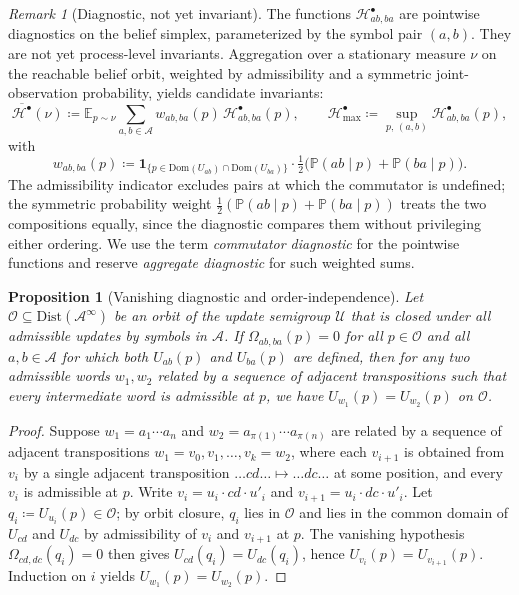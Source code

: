 \documentclass[11pt,a4paper]{article}
\theoremstyle{plain}
\newtheorem{proposition}[theorem]{Proposition}
\theoremstyle{definition}
\theoremstyle{remark}
\newtheorem{remark}[theorem]{Remark}
\newcommand{\Dist}{\mathrm{Dist}}
\newcommand{\Prob}{\mathbb{P}}
\newcommand{\eqdef}{\coloneqq}
\newcommand{\Alphabet}{\mathcal{A}}
\newcommand{\Dom}{\mathrm{Dom}}
\begin{document}
\begin{remark}[Diagnostic, not yet invariant]
\label{rem:diagnostic}
The functions $\mathcal{H}^{\bullet}_{ab,ba}$ are pointwise diagnostics on the belief simplex, parameterized by the symbol pair $(a, b)$. They are not yet process-level invariants. Aggregation over a stationary measure $\nu$ on the reachable belief orbit, weighted by admissibility and a symmetric joint-observation probability, yields candidate invariants:
\begin{equation}
    \overline{\mathcal{H}^{\bullet}}(\nu) \eqdef \mathbb{E}_{p \sim \nu} \sum_{a, b \in \Alphabet} w_{ab,ba}(p)\, \mathcal{H}^{\bullet}_{ab,ba}(p), \qquad \mathcal{H}^{\bullet}_{\max} \eqdef \sup_{p, \,(a,b)} \mathcal{H}^{\bullet}_{ab,ba}(p),
\end{equation}
with
\begin{equation}
    w_{ab,ba}(p) \eqdef \mathbf{1}_{\{p \in \Dom(U_{ab}) \cap \Dom(U_{ba})\}} \cdot \tfrac{1}{2}\bigl(\Prob(ab \mid p) + \Prob(ba \mid p)\bigr).
\end{equation}
The admissibility indicator excludes pairs at which the commutator is undefined; the symmetric probability weight $\tfrac{1}{2}(\Prob(ab \mid p) + \Prob(ba \mid p))$ treats the two compositions equally, since the diagnostic compares them without privileging either ordering. We use the term \emph{commutator diagnostic} for the pointwise functions and reserve \emph{aggregate diagnostic} for such weighted sums.
\end{remark}

\begin{proposition}[Vanishing diagnostic and order-independence]
\label{prop:commutative-action}
Let $\mathcal{O} \subseteq \Dist(\Alphabet^\infty)$ be an orbit of the update semigroup $\mathcal{U}$ that is closed under all admissible updates by symbols in $\Alphabet$. If $\Omega_{ab,ba}(p) = 0$ for all $p \in \mathcal{O}$ and all $a, b \in \Alphabet$ for which both $U_{ab}(p)$ and $U_{ba}(p)$ are defined, then for any two admissible words $w_1, w_2$ related by a sequence of adjacent transpositions such that every intermediate word is admissible at $p$, we have $U_{w_1}(p) = U_{w_2}(p)$ on $\mathcal{O}$.
\end{proposition}

\begin{proof}
Suppose $w_1 = a_1 \cdots a_n$ and $w_2 = a_{\pi(1)} \cdots a_{\pi(n)}$ are related by a sequence of adjacent transpositions $w_1 = v_0, v_1, \ldots, v_k = w_2$, where each $v_{i+1}$ is obtained from $v_i$ by a single adjacent transposition $\ldots cd \ldots \mapsto \ldots dc \ldots$ at some position, and every $v_i$ is admissible at $p$. Write $v_i = u_i \cdot cd \cdot u'_i$ and $v_{i+1} = u_i \cdot dc \cdot u'_i$. Let $q_i \eqdef U_{u_i}(p) \in \mathcal{O}$; by orbit closure, $q_i$ lies in $\mathcal{O}$ and lies in the common domain of $U_{cd}$ and $U_{dc}$ by admissibility of $v_i$ and $v_{i+1}$ at $p$. The vanishing hypothesis $\Omega_{cd,dc}(q_i) = 0$ then gives $U_{cd}(q_i) = U_{dc}(q_i)$, hence $U_{v_i}(p) = U_{v_{i+1}}(p)$. Induction on $i$ yields $U_{w_1}(p) = U_{w_2}(p)$.
\end{proof}
\end{document}
